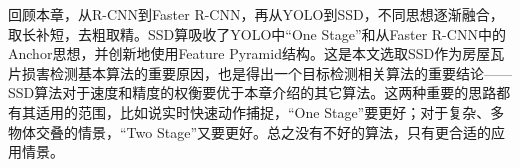 回顾本章，从R-CNN到Faster R-CNN，再从YOLO到SSD，不同思想逐渐融合，取长补短，去粗取精。SSD算吸收了YOLO中“One Stage”和从Faster R-CNN中的Anchor思想，并创新地使用Feature Pyramid结构。这是本文选取SSD作为房屋瓦片损害检测基本算法的重要原因，也是得出一个目标检测相关算法的重要结论——SSD算法对于速度和精度的权衡要优于本章介绍的其它算法。这两种重要的思路都有其适用的范围，比如说实时快速动作捕捉，“One Stage”要更好；对于复杂、多物体交叠的情景，“Two Stage”又要更好。总之没有不好的算法，只有更合适的应用情景。